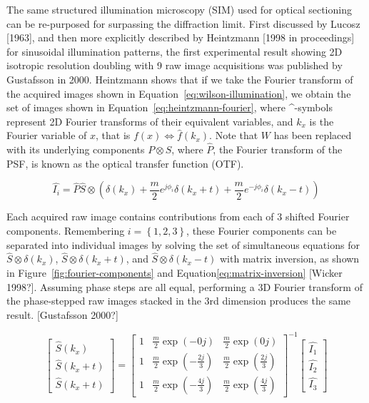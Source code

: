 The same structured illumination microscopy (SIM) used for optical sectioning can be re-purposed for surpassing the diffraction limit. 
First discussed by Lucosz [1963], and then more explicitly described by Heintzmann [1998 in proceedings] for sinusoidal illumination patterns, the first experimental result showing 2D isotropic resolution doubling with 9 raw image acquisitions was published by Gustafsson in \num{2000}. 
Heintzmann shows that if we take the Fourier transform of the acquired images shown in Equation~\ref{eq:wilson-illumination}, we obtain the set of images shown in Equation~\ref{eq:heintzmann-fourier}, where \^{}-symbols represent 2D Fourier transforms of their equivalent variables, and $k_x$ is the Fourier variable of $x$, that is $f(x) \Leftrightarrow \hat{f}(k_x)$. 
Note that $W$ has been replaced with its underlying components $P\otimes S$, where $\hat{P}$, the Fourier transform of the PSF, is known as the optical transfer function (OTF). 

\begin{equation} \label{eq:heintzmann-fourier}
\hat{I_i} = \hat{P} \hat{S} \otimes \left( \delta \left( k_x \right) + \frac{m}{2} e^{j\phi_i} \delta \left( k_x + t \right) + \frac{m}{2} e^{-j\phi_i} \delta \left( k_x - t \right) \right) 
\end{equation}

Each acquired raw image contains contributions from each of 3 shifted Fourier components. 
Remembering $i=\left\lbrace1,2,3\right\rbrace$, these Fourier components can be separated into individual images by solving the set of simultaneous equations for $\hat{S}\otimes\delta \left( k_x \right)$, $\hat{S}\otimes\delta \left( k_x + t \right)$, and $\hat{S}\otimes\delta \left( k_x - t \right)$ with matrix inversion, as shown in Figure~\ref{fig:fourier-components} and Equation\ref{eq:matrix-inversion} [Wicker 1998?]. 
Assuming phase steps are all equal, performing a 3D Fourier transform of the phase-stepped raw images stacked in the 3rd dimension produces the same result. [Gustafsson 2000?]

\begin{equation} \label{eq:matrix-inversion}
\begin{bmatrix} \hat{S}\left(k_x\right) \\ \hat{S}\left(k_x+t\right) \\ \hat{S}\left(k_x+t\right) \end{bmatrix} = 
\begin{bmatrix}
1 & \frac{m}{2}\exp\left(-0j\right) & \frac{m}{2}\exp\left(0j\right) \\ 
1 & \frac{m}{2}\exp\left(-\frac{2j}{3}\right) & \frac{m}{2}\exp\left(\frac{2j}{3}\right) \\ 
1 & \frac{m}{2}\exp\left(-\frac{4j}{3}\right) & \frac{m}{2}\exp\left(\frac{4j}{3}\right)
\end{bmatrix}^{-1}
\begin{bmatrix} \hat{I_1} \\ \hat{I_2} \\ \hat{I_3} \end{bmatrix}
\end{equation}


